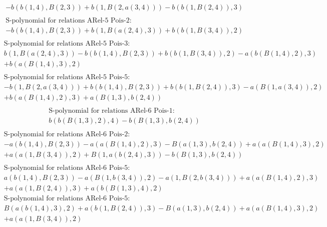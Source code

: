 \documentclass[11pt]{amsart}
\begin{document}
\begin{align*}
& - b(b(1,4),B(2,3)) + b(1,B(2,a(3,4))) - b(b(1,B(2,4)),3) \\ 
\end{align*}\begin{align*} 
& \text{S-polynomial for relations ARel-5 Pois-2:} \\ 
& - b(b(1,4),B(2,3)) + b(1,B(a(2,4),3)) + b(b(1,B(3,4)),2) \\ 
\end{align*}\begin{align*} 
& \text{S-polynomial for relations ARel-5 Pois-3:} \\ 
&b(1,B(a(2,4),3)) - b(b(1,4),B(2,3)) + b(b(1,B(3,4)),2) - a(b(B(1,4),2),3)\\ 
 &  + b(a(B(1,4),3),2) \\ 
\end{align*}\begin{align*} 
& \text{S-polynomial for relations ARel-5 Pois-5:} \\ 
& - b(1,B(2,a(3,4))) + b(b(1,4),B(2,3)) + b(b(1,B(2,4)),3) - a(B(1,a(3,4)),2)\\ 
 &  + b(a(B(1,4),2),3) + a(B(1,3),b(2,4)) \\ 
\end{align*}\begin{align*} 
& \text{S-polynomial for relations ARel-6 Pois-1:} \\ 
&b(b(B(1,3),2),4) - b(B(1,3),b(2,4)) \\ 
\end{align*}\begin{align*} 
& \text{S-polynomial for relations ARel-6 Pois-2:} \\ 
& - a(b(1,4),B(2,3)) - a(a(B(1,4),2),3) - B(a(1,3),b(2,4)) + a(a(B(1,4),3),2)\\ 
 &  + a(a(1,B(3,4)),2) + B(1,a(b(2,4),3)) - b(B(1,3),b(2,4)) \\ 
\end{align*}\begin{align*} 
& \text{S-polynomial for relations ARel-6 Pois-5:} \\ 
&a(b(1,4),B(2,3)) - a(B(1,b(3,4)),2) - a(1,B(2,b(3,4))) + a(a(B(1,4),2),3)\\ 
 &  + a(a(1,B(2,4)),3) + a(b(B(1,3),4),2) \\ 
& \text{S-polynomial for relations ARel-6 Pois-5:} \\ 
&B(a(b(1,4),3),2) + a(b(1,B(2,4)),3) - B(a(1,3),b(2,4)) + a(a(B(1,4),3),2)\\ 
 &  + a(a(1,B(3,4)),2) \\ 

\end{align*}
\end{document}
